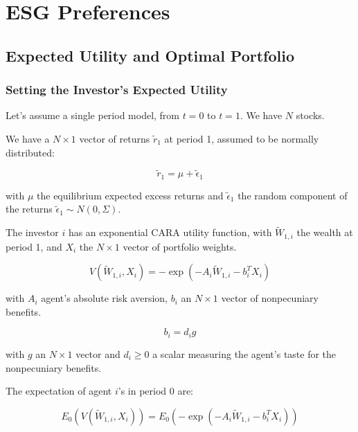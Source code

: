 \chapter{ESG Preferences}

\section{Expected Utility and Optimal Portfolio}


\subsection{Setting the Investor's Expected Utility}

Let's assume a single period model, from $t=0$ to $t=1$.
We have $N$ stocks. 

We have a $N \times 1$ vector of returns $\tilde{r}_1$ at period 1, 
assumed to be normally distributed: 

\begin{equation}
    \tilde{r}_1 = \mu + \tilde{\epsilon}_1
\end{equation}

with $\mu$ the equilibrium expected excess returns and $\tilde{\epsilon}_1$ the
random component of the returns $\tilde{\epsilon}_1 \sim N(0, \Sigma)$.

The investor $i$ has an exponential CARA utility function, with 
$\tilde{W}_{1,i}$ the wealth at period 1, and $X_i$ the
$N \times 1$ vector of portfolio weights.

\begin{equation}
    V(\tilde{W}_{1,i}, X_i) = -\exp{(-A_i \tilde{W}_{1,i}-b_i^T X_i)}
\end{equation}

with $A_i$ agent's absolute risk aversion, $b_i$ an $N \times 1$ vector of nonpecuniary 
benefits. 

\begin{equation}
    b_i = d_i g 
\end{equation}

with $g$ an $N \times 1$ vector and $d_i \geq 0$ a scalar measuring 
the agent's taste for the nonpecuniary benefits.


The expectation of agent $i$'s in period 0 are:

\begin{equation}
    E_0(V(\tilde{W}_{1,i}, X_i)) = E_0(-\exp{(-A_i \tilde{W}_{1,i}-b_i^T X_i)})
\end{equation}

